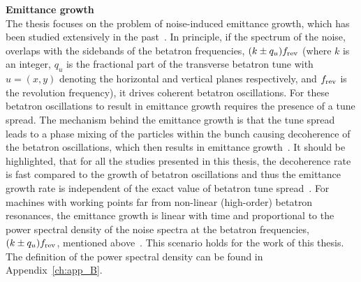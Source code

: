 \textbf{Emittance growth}\\
The thesis focuses on the problem of noise-induced emittance growth, which has been studied extensively in the past~\cite{Lebedev:248620, Lebedev:248622, PhysRevSTAB.18.101001}. In principle, if the spectrum of the noise, overlaps with the sidebands of the betatron frequencies, $(k \pm q_u) {f_\mathrm{rev}}$ (where $k$ is an integer, $q_u$ is the fractional part of the transverse betatron tune with $u=(x,y)$ denoting the horizontal and vertical planes respectively, and ${f_\mathrm{rev}}$ is the revolution frequency), it drives coherent betatron oscillations. For these betatron oscillations to result in emittance growth requires the presence of a tune spread. The mechanism behind the emittance growth is that the tune spread leads to a phase mixing of the particles within the bunch causing decoherence of the betatron oscillations, which then results in emittance growth~\cite{Lebedev:248620}. It should be highlighted, that for all the studies presented in this thesis, the decoherence rate is fast compared to the growth of betatron oscillations and thus the emittance growth rate is independent of the exact value of betatron tune spread~\cite{Lebedev:248620}. For machines with working points far from non-linear (high-order) betatron resonances, the emittance growth is linear with time and proportional to the power spectral density of the noise spectra at the betatron frequencies, $(k \pm q_u) {f_\mathrm{rev}}$, mentioned above~\cite{Lebedev:248620}. This scenario holds for the work of this thesis. The definition of the power spectral density can be found in Appendix~\ref{ch:app_B}. 




